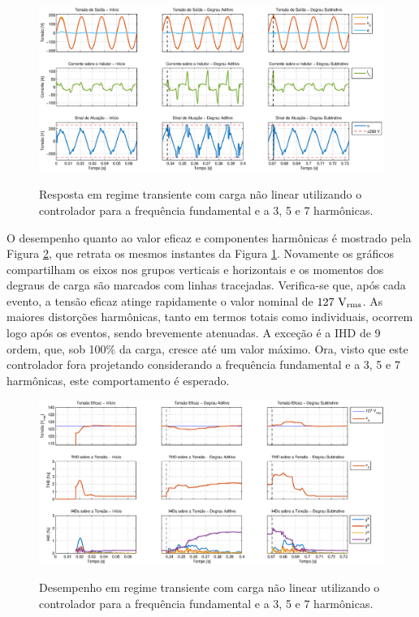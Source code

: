 \documentclass[repeatfields,oneside,overleaf]{tcc}
\begin{document}
\begin{figure}[!h]
    \centering
    \caption{Resposta em regime transiente com carga não linear utilizando o controlador para a frequência fundamental e a 3{\textordfeminine}, 5{\textordfeminine} e 7{\textordfeminine} harmônicas.}
    \includegraphics[trim={80 20 1 20}, clip, width=\linewidth]{fig/closed_7.eps}
    \\
    \label{fig:closed_7}
\end{figure}

\newpage
O desempenho quanto ao valor eficaz e componentes harmônicas é mostrado pela Figura \ref{fig:harm_7}, que retrata os mesmos instantes da Figura \ref{fig:closed_7}.
Novamente os gráficos compartilham os eixos nos grupos verticais e horizontais e os momentos dos degraus de carga são marcados com linhas tracejadas.
Verifica-se que, após cada evento, a tensão eficaz atinge rapidamente o valor nominal de $127 \text{ V\textsubscript{rms}}$.
As maiores distorções harmônicas, tanto em termos totais como individuais, ocorrem logo após os eventos, sendo brevemente atenuadas.
A exceção é a IHD de 9{\textordfeminine} ordem, que, sob 100\% da carga, cresce até um valor máximo.
Ora, visto que este controlador fora projetando considerando a frequência fundamental e a 3{\textordfeminine}, 5{\textordfeminine} e 7{\textordfeminine} harmônicas, este comportamento é esperado.

\begin{figure}[h]
    \centering
    \caption{Desempenho em regime transiente com carga não linear utilizando o controlador para a frequência fundamental e a 3{\textordfeminine}, 5{\textordfeminine} e 7{\textordfeminine} harmônicas.}
    \includegraphics[trim={80 20 1 20}, clip, width=\linewidth]{fig/harm_7.eps}
    \\
    \label{fig:harm_7}
\end{figure}
\end{document}
